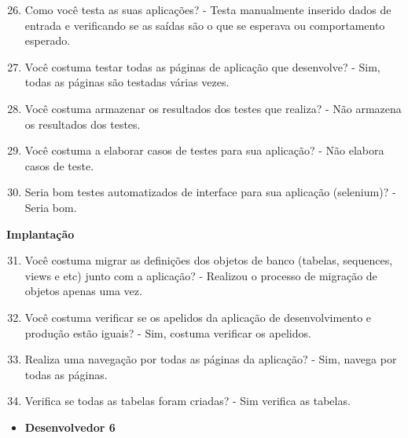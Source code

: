 \begin{anexosenv}
\begin{enumerate}
\setcounter{enumi}{25}
\item Como você testa as suas aplicações?\newline
- Testa manualmente inserido dados de entrada e verificando se as saídas são o que se esperava ou comportamento esperado.
\item Você costuma testar todas as páginas de aplicação que desenvolve?\newline
- Sim, todas as páginas são testadas várias vezes.
\item Você costuma armazenar os resultados dos testes que realiza?\newline
- Não armazena os resultados dos testes.
\item Você costuma a elaborar casos de testes para sua aplicação?\newline
- Não elabora casos de teste.
\item Seria bom testes automatizados de interface para sua aplicação (selenium)?\newline
- Seria bom.
\end{enumerate}

\textbf{Implantação}

\begin{enumerate}
\setcounter{enumi}{30}
\item Você costuma migrar as definições dos objetos de banco (tabelas, sequences, views e
etc) junto com a aplicação?\newline
- Realizou o processo de migração de objetos apenas uma vez.
\item Você costuma verificar se os apelidos da aplicação de desenvolvimento e produção
estão iguais?\newline
- Sim, costuma verificar os apelidos.
\item Realiza uma navegação por todas as páginas da aplicação?\newline
- Sim, navega por todas as páginas.
\item Verifica se todas as tabelas foram criadas?\newline
- Sim verifica as tabelas.
\end{enumerate}



\begin{itemize}
\item \textbf{Desenvolvedor 6}
\end{itemize}


\end{anexosenv}
